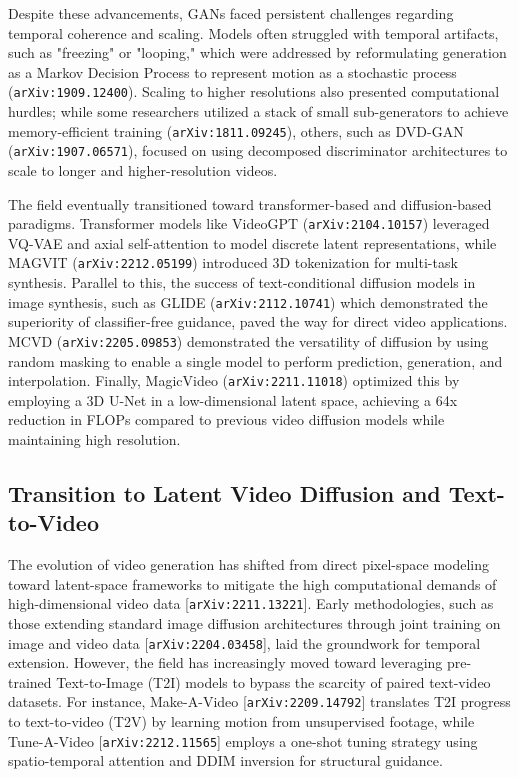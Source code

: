 \documentclass[11pt]{article}
\begin{document}
Despite these advancements, GANs faced persistent challenges regarding temporal coherence and scaling. Models often struggled with temporal artifacts, such as "freezing" or "looping," which were addressed by reformulating generation as a Markov Decision Process to represent motion as a stochastic process (\texttt{arXiv:1909.12400}). Scaling to higher resolutions also presented computational hurdles; while some researchers utilized a stack of small sub-generators to achieve memory-efficient training (\texttt{arXiv:1811.09245}), others, such as DVD-GAN (\texttt{arXiv:1907.06571}), focused on using decomposed discriminator architectures to scale to longer and higher-resolution videos.

The field eventually transitioned toward transformer-based and diffusion-based paradigms. Transformer models like VideoGPT (\texttt{arXiv:2104.10157}) leveraged VQ-VAE and axial self-attention to model discrete latent representations, while MAGVIT (\texttt{arXiv:2212.05199}) introduced 3D tokenization for multi-task synthesis. Parallel to this, the success of text-conditional diffusion models in image synthesis, such as GLIDE (\texttt{arXiv:2112.10741}) which demonstrated the superiority of classifier-free guidance, paved the way for direct video applications. MCVD (\texttt{arXiv:2205.09853}) demonstrated the versatility of diffusion by using random masking to enable a single model to perform prediction, generation, and interpolation. Finally, MagicVideo (\texttt{arXiv:2211.11018}) optimized this by employing a 3D U-Net in a low-dimensional latent space, achieving a 64x reduction in FLOPs compared to previous video diffusion models while maintaining high resolution.

\subsection{Transition to Latent Video Diffusion and Text-to-Video}

The evolution of video generation has shifted from direct pixel-space modeling toward latent-space frameworks to mitigate the high computational demands of high-dimensional video data [\texttt{arXiv:2211.13221}]. Early methodologies, such as those extending standard image diffusion architectures through joint training on image and video data [\texttt{arXiv:2204.03458}], laid the groundwork for temporal extension. However, the field has increasingly moved toward leveraging pre-trained Text-to-Image (T2I) models to bypass the scarcity of paired text-video datasets. For instance, Make-A-Video [\texttt{arXiv:2209.14792}] translates T2I progress to text-to-video (T2V) by learning motion from unsupervised footage, while Tune-A-Video [\texttt{arXiv:2212.11565}] employs a one-shot tuning strategy using spatio-temporal attention and DDIM inversion for structural guidance.
\end{document}
